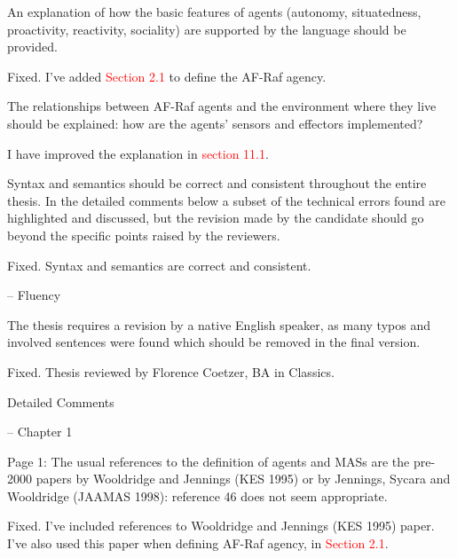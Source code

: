 \documentclass{article}
\newcommand*\R[1]{\textcolor{red}{#1}} %
\newenvironment{them}{\noindent\begingroup\color{blue}}{\endgroup\par}
\begin{document}
\begin{them}

An explanation of how the basic features of agents (autonomy, situatedness,
proactivity, reactivity, sociality) are supported by the language should be
provided. 

\end{them}
Fixed. I've added \R{Section 2.1} to define the AF-Raf agency.

\begin{them}

The relationships between AF-Raf agents and the environment where
they live should be explained: how are the agents' sensors and effectors
implemented? 

\end{them}
I have improved the explanation in \R{section 11.1}.

\begin{them}

Syntax and semantics should be correct and consistent throughout the entire
thesis. In the detailed comments below a subset of the technical errors found
are highlighted and discussed, but the revision made by the candidate should go
beyond the specific points raised by the reviewers.

\end{them}
Fixed. Syntax and semantics are correct and consistent.

\begin{them}

-- Fluency

The thesis requires a revision by a native English speaker, as many typos and
involved sentences were found which should be removed in the final version.

\end{them}
Fixed. Thesis reviewed by Florence Coetzer, BA in Classics.

\begin{them}

Detailed Comments

-- Chapter 1

Page 1:
The usual references to the definition of agents and MASs are the pre-2000
papers by Wooldridge and Jennings (KES 1995) or by Jennings, Sycara and
Wooldridge (JAAMAS 1998): reference 46 does not seem appropriate.

\end{them}
Fixed. I've included references to Wooldridge and Jennings (KES 1995) paper.
I've also used this paper when defining AF-Raf agency, in \R{Section 2.1}.
\end{document}
